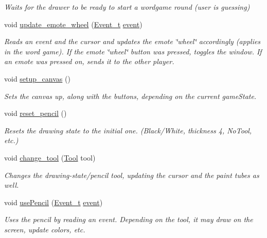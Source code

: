 \begin{DoxyCompactItemize}
\begin{DoxyCompactList}\small\item\em Waits for the drawer to be ready to start a wordgame round (user is guessing) \end{DoxyCompactList}\item 
void \mbox{\hyperlink{group__pengoo_ga60a599fe4cffb804d5375495cdc35d9c}{update\+\_\+emote\+\_\+wheel}} (\mbox{\hyperlink{struct_event__t}{Event\+\_\+t}} \mbox{\hyperlink{pengoo_8c_af662780d461acf9ac3b1321884e7cb01}{event}})
\begin{DoxyCompactList}\small\item\em Reads an event and the cursor and updates the emote \char`\"{}wheel\char`\"{} accordingly (applies in the word game). If the emote \char`\"{}wheel\char`\"{} button was pressed, toggles the window. If an emote was pressed on, sends it to the other player. \end{DoxyCompactList}\item 
void \mbox{\hyperlink{group__pengoo_ga4de72e6fe25e96efa9d419d420f34fcb}{setup\+\_\+canvas}} ()
\begin{DoxyCompactList}\small\item\em Sets the canvas up, along with the buttons, depending on the current game\+State. \end{DoxyCompactList}\item 
void \mbox{\hyperlink{group__pengoo_ga30fa7d6f201a425bca137ab6a78e8c82}{reset\+\_\+pencil}} ()
\begin{DoxyCompactList}\small\item\em Resets the drawing state to the initial one. (Black/\+White, thickness 4, No\+Tool, etc.) \end{DoxyCompactList}\item 
void \mbox{\hyperlink{group__pengoo_gac36b16b3f3b197d1e93926a0b5ba1396}{change\+\_\+tool}} (\mbox{\hyperlink{group__game__state_ga8cdac3f25ed2be17d210ff50defe0791}{Tool}} tool)
\begin{DoxyCompactList}\small\item\em Changes the drawing-\/state/pencil tool, updating the cursor and the paint tubes as well. \end{DoxyCompactList}\item 
void \mbox{\hyperlink{group__pengoo_ga6ac5130bfa3fa90697b1368d605563c0}{use\+Pencil}} (\mbox{\hyperlink{struct_event__t}{Event\+\_\+t}} \mbox{\hyperlink{pengoo_8c_af662780d461acf9ac3b1321884e7cb01}{event}})
\begin{DoxyCompactList}\small\item\em Uses the pencil by reading an event. Depending on the tool, it may draw on the screen, update colors, etc. \end{DoxyCompactList}\item 

\end{DoxyCompactItemize}
